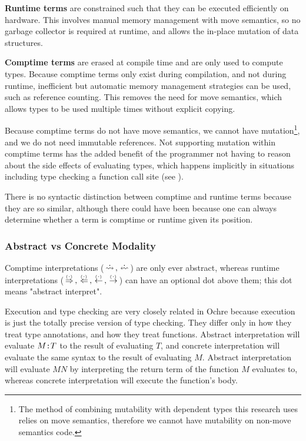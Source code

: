 \documentclass[12pt,twoside]{report}
\begin{document}
\textbf{Runtime terms} are constrained such that they can be executed efficiently on hardware. This involves manual memory management with move semantics, so no garbage collector is required at runtime, and allows the in-place mutation of data structures.

\textbf{Comptime terms} are erased at compile time and are only used to compute types. Because comptime terms only exist during compilation, and not during runtime, inefficient but automatic memory management strategies can be used, such as reference counting. This removes the need for move semantics, which allows types to be used multiple times without explicit copying.

Because comptime terms do not have move semantics, we cannot have mutation\footnote{The method of combining mutability with dependent types this research uses relies on move semantics, therefore we cannot have mutability on non-move semantics code.}, and we do not need immutable references. Not supporting mutation within comptime terms has the added benefit of the programmer not having to reason about the side effects of evaluating types, which happens implicitly in situations including type checking a function call site (see ).
 
There is no syntactic distinction between comptime and runtime terms because they are so similar, although there could have been because one can always determine whether a term is comptime or runtime given its position.

\subsubsection{Abstract vs Concrete Modality}
Comptime interpretations ($\erasedreadarrow, \erasedwritearrow$) are only ever abstract, whereas runtime interpretations ($\,\stackrel{_(._)}{\Rightarrow}\,, \,\stackrel{_(._)}{\Leftarrow}\,, \,\stackrel{_(._)}{\leftarrow}\,, \,\stackrel{_(._)}{\rightarrow}\,$) can have an optional dot above them; this dot means "abstract interpret".

Execution and type checking are very closely related in Ochre because execution is just the totally precise version of type checking. They differ only in how they treat type annotations, and how they treat functions. Abstract interpretation will evaluate $M \text{\texttt{:}} T$ to the result of evaluating $T$, and concrete interpretation will evaluate the same syntax to the result of evaluating $M$. Abstract interpretation will evaluate $M N$ by interpreting the return term of the function $M$ evaluates to, whereas concrete interpretation will execute the function's body.
\end{document}
